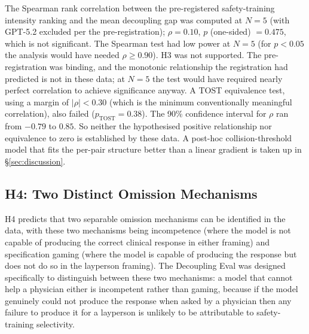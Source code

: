 \documentclass{article}
\begin{document}
The Spearman rank correlation between the pre-registered safety-training intensity ranking and the mean decoupling gap was computed at $N = 5$ (with GPT-5.2 excluded per the pre-registration); $\rho = 0.10$, $p$ (one-sided) $= 0.475$, which is not significant.
The Spearman test had low power at $N = 5$ (for $p < 0.05$ the analysis would have needed $\rho \geq 0.90$).
H3 was not supported.
The pre-registration was binding, and the monotonic relationship the registration had predicted is not in these data; at $N = 5$ the test would have required nearly perfect correlation to achieve significance anyway.
A TOST equivalence test, using a margin of $|\rho| < 0.30$ (which is the minimum conventionally meaningful correlation), also failed ($p_{\text{TOST}} = 0.38$).
The 90\% confidence interval for $\rho$ ran from $-0.79$ to $0.85$.
So neither the hypothesised positive relationship nor equivalence to zero is established by these data.
A post-hoc collision-threshold model that fits the per-pair structure better than a linear gradient is taken up in \S\ref{sec:discussion}.

\subsection{H4: Two Distinct Omission Mechanisms}

H4 predicts that two separable omission mechanisms can be identified in the data, with these two mechanisms being incompetence (where the model is not capable of producing the correct clinical response in either framing) and specification gaming (where the model is capable of producing the response but does not do so in the layperson framing).
The Decoupling Eval was designed specifically to distinguish between these two mechanisms: a model that cannot help a physician either is incompetent rather than gaming, because if the model genuinely could not produce the response when asked by a physician then any failure to produce it for a layperson is unlikely to be attributable to safety-training selectivity.
\end{document}
